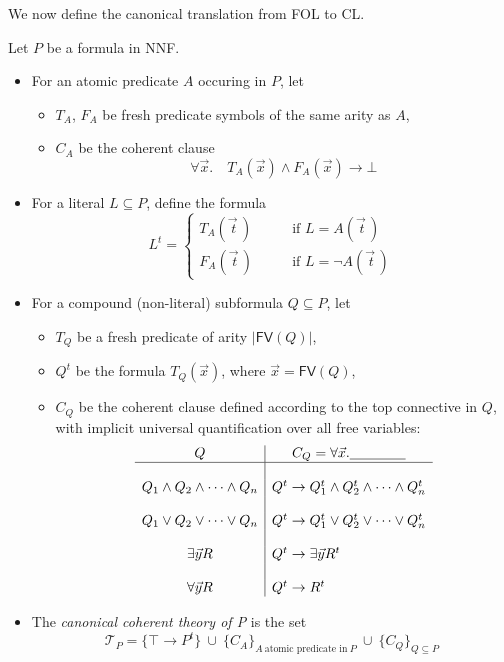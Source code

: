 \documentclass[a4paper,11pt]{article}
\newcommand{\fv}[1]{\mathsf{FV} #1}
\begin{document}
\newpage
We now define the canonical translation from FOL to CL.
\begin{dfn} \label{nnfxl}
Let $P$ be a formula in NNF.
\begin{itemize}

\item
For an atomic predicate $A$ occuring in $P$, let
\begin{itemize}
\item
$T_A$, $F_A$ be fresh predicate symbols of the same arity as $A$,
\item
$C_A$ be the coherent clause
\[\forall \vec x. \quad T_A(\vec x) \land F_A(\vec x) \to \bot\]
\end{itemize}

\item
For a literal $L \subseteq P$, define the formula
\[L^t = 
\begin{cases} 
T_A(\vec{\,t}\,) & \qquad \text{if $L = A(\vec{\,t}\,)$}\\
F_A(\vec{\,t}\,) & \qquad \text{if $L = \lnot A(\vec{\,t}\,)$}
\end{cases}
\]

\item
For a compound (non-literal) subformula $Q \subseteq P$, let
\begin{itemize}
\item
$T_Q$ be a fresh predicate of arity $|\fv (Q)|$,
\item
$Q^t$ be the formula $T_Q(\vec x)$, where $\vec x = \fv (Q)$,
\item
$C_Q$ be the coherent clause defined according to the top connective in $Q$,
with implicit universal quantification over all free variables:
\large{
\[
\begin{array}{c|l}
Q &\multicolumn{1}{c}{C_Q=\forall \vec x.\underline{\qquad\qquad}}\\
\hline
\\Q_1 \land Q_2 \land \cdots \land Q_n &
Q^t \to Q^t_1 \land Q^t_2 \land \cdots \land Q^t_n \\
\\Q_1 \lor Q_2 \lor \cdots \lor Q_n &
Q^t \to Q^t_1 \lor Q^t_2 \lor \cdots \lor Q^t_n \\
\\\exists \vec{y} R&
Q^t \to \exists \vec{y} R^t\\
\\\forall \vec{y} R &
Q^t \to R^t
\end{array}
\]
}
\end{itemize}

\item
The \emph{canonical coherent theory of P} is the set
\[\mathcal{T}_P = \{\top \to P^t\} ~\cup~ 
\{C_A\}_{A~\text{atomic predicate in}~P} ~\cup~ \{C_Q\}_{Q\subseteq P} 
\]

\end{itemize}
\end{dfn}
\end{document}
